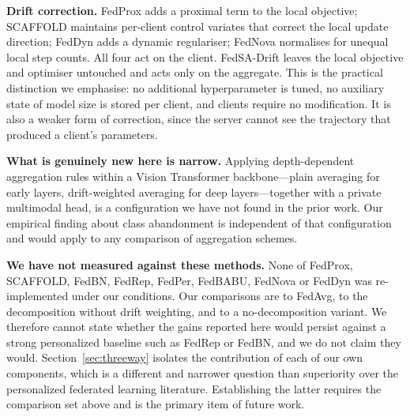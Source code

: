 \documentclass[utf8]{FrontiersinHarvard} %
\newcommand{\sadrift}{FedSA-Drift}
\begin{document}
\textbf{Drift correction.} FedProx adds a proximal term to the local objective; SCAFFOLD maintains per-client control variates that correct the local update direction; FedDyn adds a dynamic regulariser; FedNova normalises for unequal local step counts. All four act on the client. \sadrift{} leaves the local objective and optimiser untouched and acts only on the aggregate. This is the practical distinction we emphasise: no additional hyperparameter is tuned, no auxiliary state of model size is stored per client, and clients require no modification. It is also a weaker form of correction, since the server cannot see the trajectory that produced a client's parameters.

\textbf{What is genuinely new here is narrow.} Applying depth-dependent aggregation rules within a Vision Transformer backbone---plain averaging for early layers, drift-weighted averaging for deep layers---together with a private multimodal head, is a configuration we have not found in the prior work. Our empirical finding about class abandonment is independent of that configuration and would apply to any comparison of aggregation schemes.

\textbf{We have not measured against these methods.} None of FedProx, SCAFFOLD, FedBN, FedRep, FedPer, FedBABU, FedNova or FedDyn was re-implemented under our conditions. Our comparisons are to FedAvg, to the decomposition without drift weighting, and to a no-decomposition variant. We therefore cannot state whether the gains reported here would persist against a strong personalized baseline such as FedRep or FedBN, and we do not claim they would. Section~\ref{sec:threeway} isolates the contribution of each of our own components, which is a different and narrower question than superiority over the personalized federated learning literature. Establishing the latter requires the comparison set above and is the primary item of future work.
\end{document}

